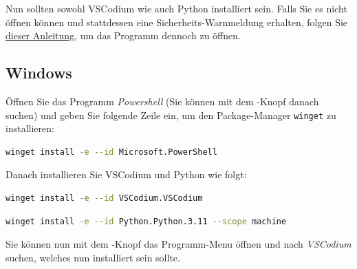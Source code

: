 Nun sollten sowohl VSCodium wie auch Python installiert sein. Falls Sie es nicht öffnen können und stattdessen eine Sicherheits-Warnmeldung erhalten, folgen Sie \href{https://support.apple.com/de-ch/guide/mac-help/mh40616/mac}{dieser Anleitung}, um das Programm dennoch zu öffnen.

\subsection{Windows}
Öffnen Sie das Programm \textit{Powershell} (Sie können mit dem \keys{\faWindows}-Knopf danach suchen) und geben Sie folgende Zeile ein, um den Package-Manager \texttt{winget} zu installieren:
\begin{lstlisting}[language=bash, numbers=none]
winget install -e --id Microsoft.PowerShell
\end{lstlisting}



Danach installieren Sie VSCodium und Python wie folgt:
\begin{lstlisting}[language=bash, numbers=none]
winget install -e --id VSCodium.VSCodium
\end{lstlisting}

\begin{lstlisting}[language=bash, numbers=none]
winget install -e --id Python.Python.3.11 --scope machine
\end{lstlisting}


Sie können nun mit dem \keys{\faWindows}-Knopf das Programm-Menu öffnen und nach \textit{VSCodium} suchen, welches nun installiert sein sollte.
